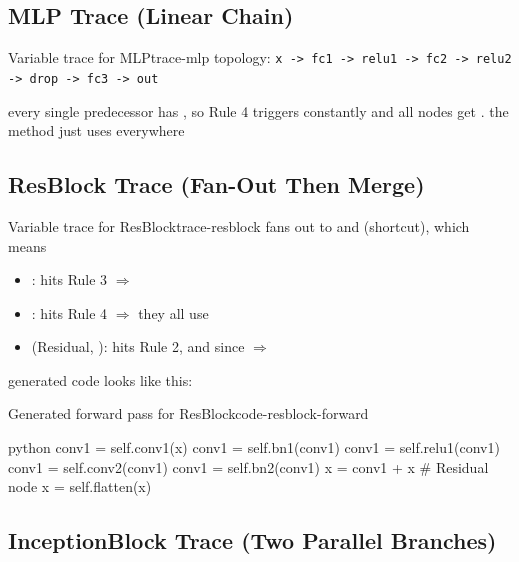 \documentclass{nngraph-en}
\begin{document}
\subsection{MLP Trace (Linear Chain)}

\begin{exbox}{Variable trace for MLP}{trace-mlp}
topology:
\texttt{x -> fc1 -> relu1 -> fc2 -> relu2 -> drop -> fc3 -> out}

every single predecessor has , so Rule 4 triggers constantly and all nodes get . the  method just uses  everywhere
\end{exbox}

\subsection{ResBlock Trace (Fan-Out Then Merge)}

\begin{exbox}{Variable trace for ResBlock}{trace-resblock}
 fans out to  and  (shortcut), which means 

\begin{itemize}
    \item {}: hits Rule 3 $\Rightarrow$ 
    \item {}: hits Rule 4 $\Rightarrow$ they all use 
    \item {} (Residual, ): hits Rule 2, and since  $\Rightarrow$ 
\end{itemize}

generated code looks like this:
\begin{codebox}{Generated forward pass for ResBlock}{code-resblock-forward}
\begin{amzcode}{python}
conv1 = self.conv1(x)
conv1 = self.bn1(conv1)
conv1 = self.relu1(conv1)
conv1 = self.conv2(conv1)
conv1 = self.bn2(conv1)
x     = conv1 + x       # Residual node
x     = self.flatten(x)
\end{amzcode}
\end{codebox}
\end{exbox}

\subsection{InceptionBlock Trace (Two Parallel Branches)}
\end{document}
